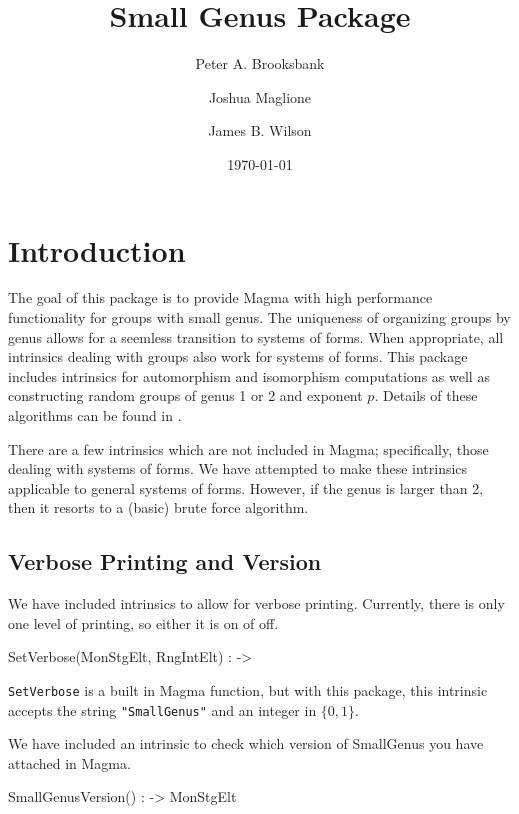 \documentclass{documentation}
\title{Small Genus Package}
\author{Peter A. Brooksbank}
\author{Joshua Maglione}
\author{James B. Wilson}
\date{\today}
\begin{document}
\frontmatter

\maketitle
\tableofcontents

\mainmatter

\chapter{Introduction}

The goal of this package is to provide {\sc Magma} \cite{Magma} with high performance functionality for groups with small genus. 
The uniqueness of organizing groups by genus allows for a seemless transition to systems of forms.
When appropriate, all intrinsics dealing with groups also work for systems of forms. 
This package includes intrinsics for automorphism and isomorphism computations as well as constructing random groups of genus 1 or 2 and exponent $p$.
Details of these algorithms can be found in \cite{BMW}.

There are a few intrinsics which are not included in {\sc Magma}; specifically, those dealing with systems of forms. 
We have attempted to make these intrinsics applicable to general systems of forms. However, if the genus is larger than 2, then it resorts to a (basic) brute force algorithm. 

\section{Verbose Printing and Version}

We have included intrinsics to allow for verbose printing. 
Currently, there is only one level of printing, so either it is on of off. 

\begin{intrinsics}
SetVerbose(MonStgElt, RngIntElt) : -> 
\end{intrinsics}

{\tt SetVerbose} is a built in Magma function, but with this package, this intrinsic accepts the string {\tt "SmallGenus"} and an integer in $\{0,1\}$. 

We have included an intrinsic to check which version of SmallGenus you have attached in Magma.

\begin{intrinsics}
SmallGenusVersion() : -> MonStgElt
\end{intrinsics}
\end{document}
